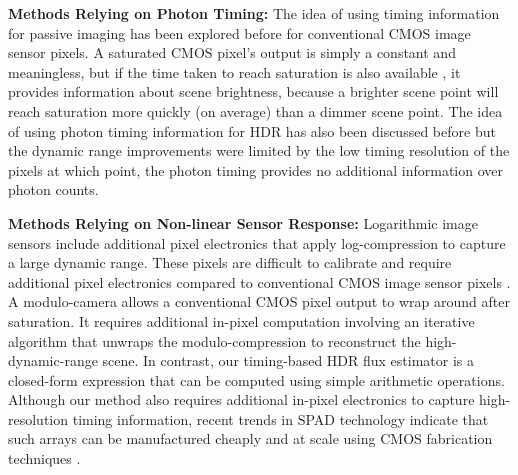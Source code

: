 \smallskip
\noindent\textbf{Methods Relying on Photon Timing:}
The idea of using timing information for passive imaging has been explored
before for conventional CMOS image sensor pixels. A saturated CMOS pixel's
output is simply a constant and meaningless, but if the time taken to reach
saturation is also available \cite{culurciello2003biomorphic}, it provides
information about scene brightness, because a brighter scene point will reach
saturation more quickly (on average) than a dimmer scene point. The idea of
using photon timing information for HDR has also been discussed before but the
dynamic range improvements were limited by the low timing resolution of the
pixels \cite{zarghami2019high, laurenzis2019single} at which point, the photon
timing provides no additional information over photon counts.

\smallskip
\noindent\textbf{Methods Relying on Non-linear Sensor Response:}
Logarithmic image sensors include additional pixel electronics that apply
log-compression to capture a large dynamic range. These pixels are difficult to
calibrate and require additional pixel electronics compared to conventional
CMOS image sensor pixels \cite{kavadias2000logarithmic}. A modulo-camera
\cite{zhao2015unbounded} allows a conventional CMOS pixel output to wrap around
after saturation. It requires additional in-pixel computation involving an
iterative algorithm that unwraps the modulo-compression to reconstruct the
high-dynamic-range scene. In contrast, our timing-based HDR flux estimator is a
closed-form expression that can be computed using simple arithmetic operations.
Although our method also requires additional in-pixel electronics to capture
high-resolution timing information, recent trends in SPAD technology indicate
that such arrays can be manufactured cheaply and at scale using CMOS
fabrication techniques \cite{Henderson_2019, Henderson_2019_ISSCC}.

